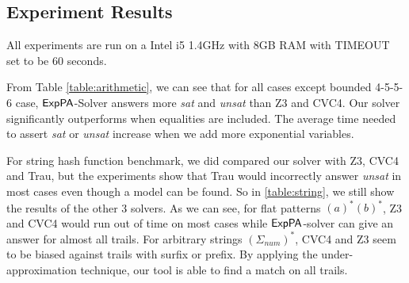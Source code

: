 \subsection{Experiment Results}

All experiments are run on a Intel i5 1.4GHz with 8GB RAM with TIMEOUT set to be 60 seconds. 


From Table \ref{table:arithmetic}, we can see that for all cases except bounded 4-5-5-6 case, ${\sf ExpPA}$-Solver answers more \textit{sat} and \textit{unsat} than Z3 and CVC4. Our solver significantly outperforms when equalities are included. The average time needed to assert \textit{sat} or \textit{unsat} increase when we add more exponential variables.


For string hash function benchmark, we did compared our solver with Z3, CVC4 and Trau, but the experiments show that Trau would incorrectly answer \textit{unsat} in most cases even though a model can be found. So in \ref{table:string}, we still show the results of the other 3 solvers. As we can see, for flat patterns $(a)^*(b)^*$, Z3 and CVC4 would run out of time on most cases while ${\sf ExpPA}$-solver can give an answer for almost all trails. For arbitrary strings $(\Sigma_{num})^*$, CVC4 and Z3 seem to be biased against trails with surfix or prefix. By applying the under-approximation technique, our tool is able to find a match on all trails. 


